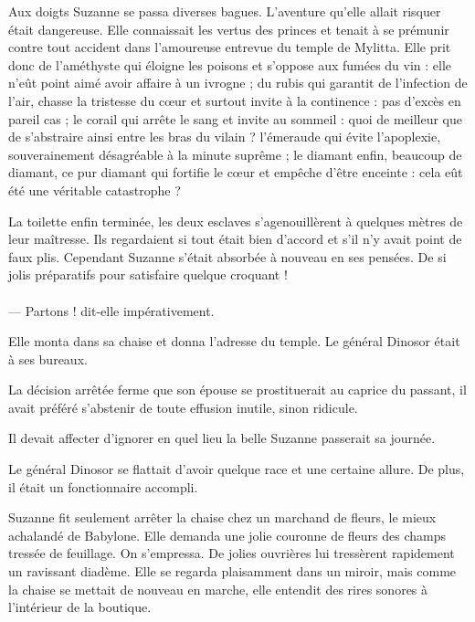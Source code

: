 \documentclass[a4paper, 11pt, oneside, polutonikogreek, french]{article}
\begin{document}
Aux doigts Suzanne se passa diverses bagues. L'aventure qu'elle allait risquer était dangereuse. Elle connaissait les vertus des princes et tenait à se prémunir contre tout accident dans l'amoureuse entrevue du temple de Mylitta. Elle prit donc de l'améthyste qui éloigne les poisons et s'oppose aux fumées du vin : elle n'eût point aimé avoir affaire à un ivrogne ; du rubis qui garantit de l'infection de l'air, chasse la tristesse du cœur et surtout invite à la continence : pas d'excès en pareil cas ; le corail qui arrête le sang et invite au sommeil : quoi de meilleur que de s'abstraire ainsi entre les bras du vilain ? l'émeraude qui évite l'apoplexie, souverainement désagréable à la minute suprême ; le diamant enfin, beaucoup de diamant, ce pur diamant qui fortifie le cœur et empêche d'être enceinte : cela eût été une véritable catastrophe ?

\bigskip
\centerline{\EightStarTaper}
\centerline{\EightStarTaper\EightStarTaper}
\bigskip

La toilette enfin terminée, les deux esclaves s'agenouillèrent à quelques mètres de leur maîtresse. Ils regardaient si tout était bien d'accord et s'il n'y avait point de faux plis. Cependant Suzanne s'était absorbée à nouveau en ses pensées. De si jolis préparatifs pour satisfaire quelque croquant !
\clearpage
\paragraph{}
--- Partons ! dit-elle impérativement.

\bigskip
\centerline{\EightStarTaper}
\centerline{\EightStarTaper\EightStarTaper}
\bigskip

Elle monta dans sa chaise et donna l'adresse du temple. Le général Dinosor était à ses bureaux.

La décision arrêtée ferme que son épouse se prostituerait au caprice du passant, il avait préféré s'abstenir de toute effusion inutile, sinon ridicule.

Il devait affecter d'ignorer en quel lieu la belle Suzanne passerait sa journée.

Le général Dinosor se flattait d'avoir quelque race et une certaine allure. De plus, il était un fonctionnaire accompli.

\bigskip
\centerline{\EightStarTaper}
\centerline{\EightStarTaper\EightStarTaper}
\bigskip

Suzanne fit seulement arrêter la chaise chez un marchand de fleurs, le mieux achalandé de Babylone. Elle demanda une jolie couronne de fleurs des champs tressée de feuillage. On s'empressa. De jolies ouvrières lui tressèrent rapidement un ravissant diadème. Elle se regarda plaisamment dans un miroir, mais comme la chaise se mettait de nouveau en marche, elle entendit des rires sonores à l'intérieur de la boutique.
\end{document}
